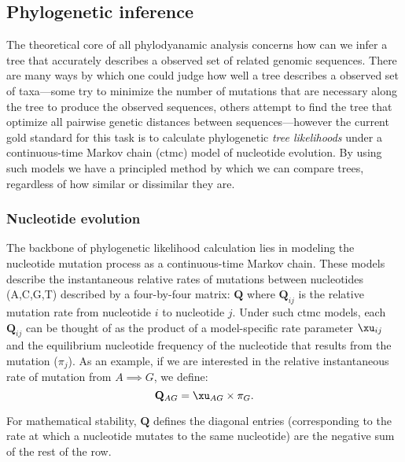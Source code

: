 \subsection{Phylogenetic inference}
The theoretical core of all phylodyanamic analysis concerns how can we infer a tree that accurately describes a observed set of related genomic sequences.
There are many ways by which one could judge how well a tree describes a observed set of taxa---some try to minimize the number of mutations that are necessary along the tree to produce the observed sequences, others attempt to find the tree that optimize all pairwise genetic distances between sequences---however the current gold standard for this task is to calculate phylogenetic \textit{tree likelihoods} under a continuous-time Markov chain (\gls{ctmc}) model of nucleotide evolution.
By using such models we have a principled method by which we can compare trees, regardless of how similar or dissimilar they are.

\subsubsection{Nucleotide evolution}
The backbone of phylogenetic likelihood calculation lies in modeling the nucleotide mutation process as a continuous-time Markov chain.
These models describe the instantaneous relative rates of mutations between nucleotides (A,C,G,T) described by a four-by-four matrix: $\mathbf{Q}$ where $\mathbf{Q}_{ij}$ is the relative mutation rate from nucleotide $i$ to nucleotide $j$.
Under such \gls{ctmc} models, each $\mathbf{Q}_{ij}$ can be thought of as the product of a model-specific rate parameter $\xu_{ij}$ and the equilibrium nucleotide frequency of the nucleotide that results from the mutation ($\pi_j$).
As an example, if we are interested in the relative instantaneous rate of mutation from $A \implies G$, we define:
\begin{equation}
  \mathbf{Q}_{AG} = \xu_{AG} \times \pi_G.
\end{equation}

For mathematical stability, $\mathbf{Q}$ defines the diagonal entries (corresponding to the rate at which a nucleotide mutates to the same nucleotide) are the negative sum of the rest of the row.

